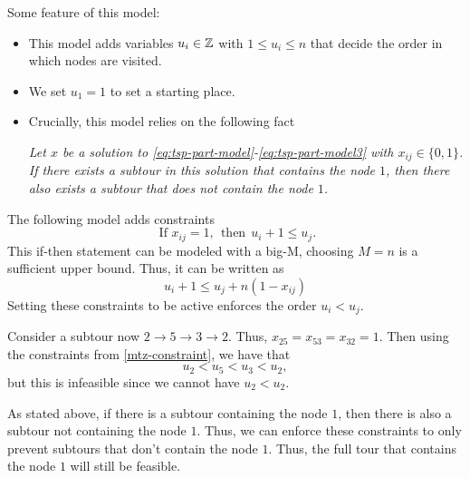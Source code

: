 Some feature of this model:
\begin{itemize}
\item This model adds variables $u_i \in {\mathbb{Z}}$ with $1 \leq u_i \leq n$ that decide the order in which nodes are visited.
\item We set $u_1 = 1$ to set a starting place.
\item Crucially, this model relies on the following fact\\
\begin{center}
\emph{
Let  $x$ be a solution to \eqref{eq:tsp-part-model}-\eqref{eq:tsp-part-model3} with $x_{ij} \in \{0,1\}$.  If there exists a subtour in this solution that contains the node $1$, then there also exists a subtour that does not contain the node $1$.}
\end{center}
\end{itemize}

The following model adds constraints
\begin{equation}
\text{ If } x_{ij} = 1, \ \ \text{then} \ \ u_i + 1 \leq u_j.
\end{equation}
This if-then statement can be modeled with a big-M, choosing $M = n$ is a sufficient upper bound.  Thus, it can be written as 
\begin{equation}
\label{mtz-constraint}
u_i + 1 \leq u_j + n(1-x_{ij})
\end{equation}
Setting these constraints to be active enforces the order $u_i < u_j$.    

Consider a subtour now  $2 \to 5 \to 3 \to 2$.  Thus, $x_{25} = x_{53} = x_{32} = 1$.  Then using the constraints from \eqref{mtz-constraint}, we have that 
\begin{equation}
u_2 < u_5 < u_3 < u_2,
\end{equation}
but this is infeasible since we cannot have $u_2 < u_2$.  

As stated above, if there is a subtour containing the node $1$, then there is also a subtour not containing the node $1$.  Thus, we can enforce these constraints to only prevent subtours that don't contain the node $1$.  Thus, the full tour that contains the node $1$ will still be feasible.

